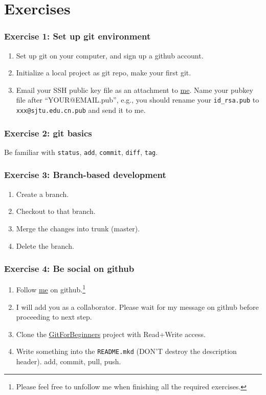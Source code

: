 \documentclass[11pt,ignorenonframetext,]{beamer}
\begin{document}
\section{Exercises}

\begin{frame}[fragile]\frametitle{Exercise 1: Set up git environment}

\begin{enumerate}[1.]
\item
  Set up git on your computer, and sign up a github account.
\item
  Initialize a local project as git repo, make your first git.
\item
  Email your SSH public key file as an attachment to
  \href{mailto:weijianwen@sjtu.edu.cn}{me}. Name your pubkey file after
  ``YOUR@EMAIL.pub'', e.g., you should rename your \texttt{id\_rsa.pub}
  to \texttt{xxx@sjtu.edu.cn.pub} and send it to me.
\end{enumerate}
\end{frame}

\begin{frame}[fragile]\frametitle{Exercise 2: git basics}

Be familiar with \texttt{status}, \texttt{add}, \texttt{commit},
\texttt{diff}, \texttt{tag}.

\end{frame}

\begin{frame}\frametitle{Exercise 3: Branch-based development}

\begin{enumerate}[1.]
\item
  Create a branch.
\item
  Checkout to that branch.
\item
  Merge the changes into trunk (master).
\item
  Delete the branch.
\end{enumerate}
\end{frame}

\begin{frame}[fragile]\frametitle{Exercise 4: Be social on github}

\begin{enumerate}[1.]
\item
  Follow \href{https://github.com/weijianwen}{me} on github.\footnote{Please
    feel free to unfollow me when finishing all the required exercises.}
\item
  I will add you as a collaborator. Please wait for my message on github
  before proceeding to next step.
\item
  Clone the
  \href{https://github.com/weijianwen/GitForBeginners}{GitForBeginners}
  project with Read+Write access.
\item
  Write something into the \texttt{README.mkd} (DON'T destroy the
  description header). add, commit, pull, push.
\end{enumerate}
\end{frame}
\end{document}
